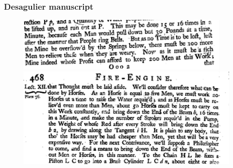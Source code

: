 \documentclass[final]{beamer}
\begin{document}
\begin{frame}
		\frametitle{Desagulier manuscript}
\begin{figure}[p!]
		\label{fig:desagulier}		
		\center
		\includegraphics[width=0.95\textwidth]{desagulier1}\\
		\includegraphics[width=1.05\textwidth]{desagulier2}
\end{figure}
\end{frame}
\end{document}
